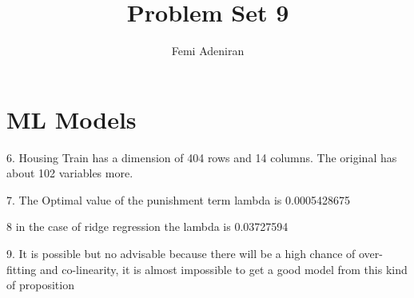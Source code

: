 \documentclass{article}
\title{Problem Set 9}
\author{Femi Adeniran}
\begin{document}
\maketitle

\begin{abstract}

\end{abstract}

\section{ML Models}

6. Housing Train has a dimension of 404 rows and 14 columns. The original has about 102 variables more.

7. The Optimal value of the punishment term lambda is 0.0005428675

8 in the case of ridge regression the lambda is 0.03727594

9. It is possible but no advisable because there will be a high chance of over-fitting and co-linearity, it is almost impossible to get a good model from this kind of proposition
\end{document}
